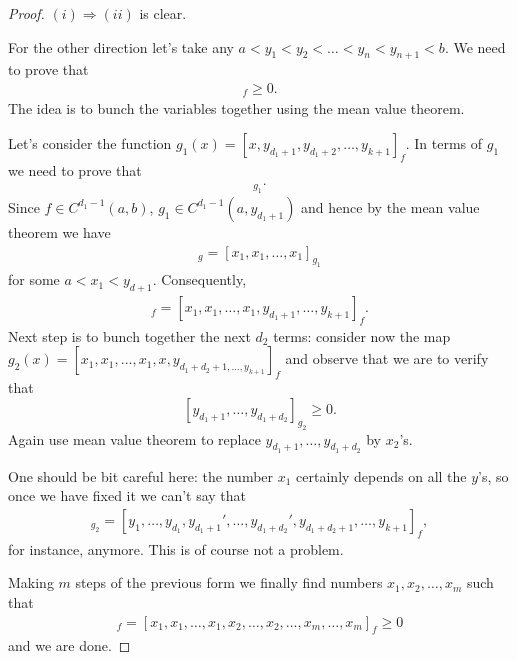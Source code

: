 \begin{proof}
	$(i) \Rightarrow (ii)$ is clear.

	For the other direction let's take any $a < y_{1} < y_{2} < \ldots < y_{n} < y_{n + 1} < b$. We need to prove that
	\begin{align*}
		[y_{1}, y_{2}, \ldots, y_{k}, y_{k + 1}]_{f} \geq 0.
	\end{align*}
	The idea is to bunch the variables together using the mean value theorem.

	Let's consider the function $g_{1}(x) = [x, y_{d_{1} + 1}, y_{d_{1} + 2}, \ldots, y_{k + 1}]_{f}$. In terms of $g_{1}$ we need to prove that
	\begin{align*}
		[y_{1}, y_{2}, \ldots, y_{d + 1}]_{g_{1}}.
	\end{align*}
	Since $f \in C^{d_{1} - 1}(a, b)$, $g_{1} \in C^{d_{1} - 1}(a, y_{d_{1} + 1})$ and hence by the mean value theorem we have
	\begin{align*}
		[y_{1}, y_{2}, \ldots, y_{d_{1}}]_{g} = [x_{1}, x_{1}, \ldots, x_{1}]_{g_{1}}
	\end{align*}
	for some $a < x_{1} < y_{d + 1}$. Consequently,
	\begin{align*}
		[y_{1}, y_{2}, \ldots, y_{k}, y_{k + 1}]_{f} = [x_{1}, x_{1}, \ldots, x_{1}, y_{d_{1} + 1}, \ldots, y_{k + 1}]_{f}.
	\end{align*}
	Next step is to bunch together the next $d_{2}$ terms: consider now the map $g_{2}(x) = [x_{1}, x_{1}, \ldots, x_{1}, x, y_{d_{1} + d_{2} + 1, \ldots, y_{k + 1}}]_{f}$ and observe that we are to verify that
	\[
		[y_{d_{1} + 1}, \ldots, y_{d_{1} + d_{2}}]_{g_{2}} \geq 0.
	\]
	Again use mean value theorem to replace $y_{d_{1} + 1}, \ldots, y_{d_{1} + d_{2}}$ by $x_{2}$'s.

	One should be bit careful here: the number $x_{1}$ certainly depends on all the $y$'s, so once we have fixed it we can't say that
	\begin{align*}
		[y_{d_{1} + 1}', y_{d_{1} + 2}', \ldots, y_{d_{1} + d_{2}}']_{g_{2}} = [y_{1}, \ldots, y_{d_{1}}, y_{d_{1} + 1}', \ldots, y_{d_{1} + d_{2}}', y_{d_{1} + d_{2} + 1}, \ldots, y_{k + 1}]_{f},
	\end{align*}
	for instance, anymore. This is of course not a problem.

	Making $m$ steps of the previous form we finally find numbers $x_{1}, x_{2}, \ldots, x_{m}$ such that
	\begin{align*}
		[y_{1}, y_{2}, \ldots, y_{k}, y_{k + 1}]_{f} = [x_{1}, x_{1}, \ldots, x_{1}, x_{2}, \ldots, x_{2}, \ldots, x_{m}, \ldots, x_{m}]_{f} \geq 0
	\end{align*}
	and we are done.
\end{proof}

